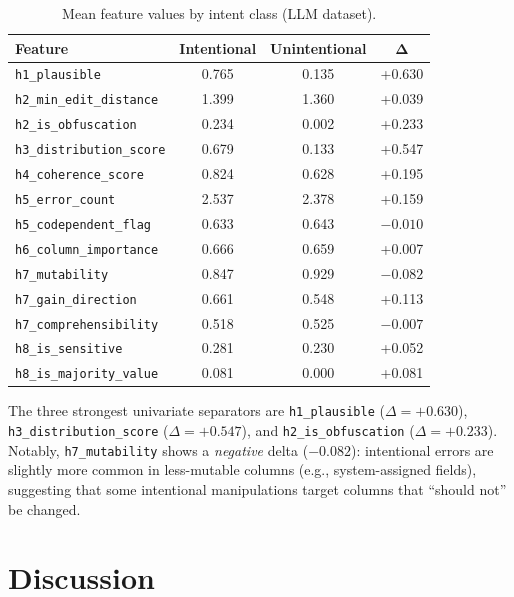 \documentclass[11pt,a4paper]{article}
\newcommand{\feat}[1]{\texttt{#1}}
\begin{document}
\begin{table}[h]
\centering
\caption{Mean feature values by intent class (LLM dataset).}
\label{tab:distributions}
\small
\begin{tabular}{@{}lccc@{}}
\toprule
\textbf{Feature} & \textbf{Intentional} & \textbf{Unintentional} & $\boldsymbol{\Delta}$ \\
\midrule
\feat{h1\_plausible}           & 0.765 & 0.135 & +0.630 \\
\feat{h2\_min\_edit\_distance} & 1.399 & 1.360 & +0.039 \\
\feat{h2\_is\_obfuscation}     & 0.234 & 0.002 & +0.233 \\
\feat{h3\_distribution\_score} & 0.679 & 0.133 & +0.547 \\
\feat{h4\_coherence\_score}    & 0.824 & 0.628 & +0.195 \\
\feat{h5\_error\_count}        & 2.537 & 2.378 & +0.159 \\
\feat{h5\_codependent\_flag}   & 0.633 & 0.643 & $-0.010$ \\
\feat{h6\_column\_importance}  & 0.666 & 0.659 & +0.007 \\
\feat{h7\_mutability}          & 0.847 & 0.929 & $-0.082$ \\
\feat{h7\_gain\_direction}     & 0.661 & 0.548 & +0.113 \\
\feat{h7\_comprehensibility}   & 0.518 & 0.525 & $-0.007$ \\
\feat{h8\_is\_sensitive}       & 0.281 & 0.230 & +0.052 \\
\feat{h8\_is\_majority\_value} & 0.081 & 0.000 & +0.081 \\
\bottomrule
\end{tabular}
\end{table}

The three strongest univariate separators are \feat{h1\_plausible}
($\Delta = +0.630$), \feat{h3\_distribution\_score} ($\Delta = +0.547$),
and \feat{h2\_is\_obfuscation} ($\Delta = +0.233$).  Notably,
\feat{h7\_mutability} shows a \emph{negative} delta ($-0.082$): intentional
errors are slightly more common in less-mutable columns (e.g.,
system-assigned fields), suggesting that some intentional manipulations
target columns that ``should not'' be changed.

\section{Discussion}
\label{sec:discussion}
\end{document}
